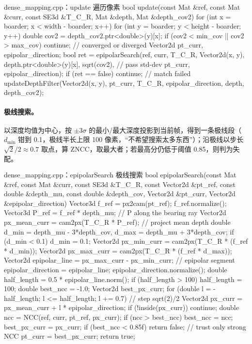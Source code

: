\begin{codebox}[C++]{dense\_mapping.cpp：update 遍历像素}
bool update(const Mat &ref, const Mat &curr, const SE3d &T_C_R,
            Mat &depth, Mat &depth_cov2) {
  for (int x = boarder; x < width  - boarder; x++)
  for (int y = boarder; y < height - boarder; y++) {
    double cov2 = depth_cov2.ptr<double>(y)[x];
    if (cov2 < min_cov || cov2 > max_cov) continue;   // converged or diverged
    Vector2d pt_curr, epipolar_direction;
    bool ret = epipolarSearch(ref, curr, T_C_R, Vector2d(x, y),
                 depth.ptr<double>(y)[x], sqrt(cov2),  // pass std-dev
                 pt_curr, epipolar_direction);
    if (ret == false) continue;                        // match failed
    updateDepthFilter(Vector2d(x, y), pt_curr, T_C_R,
                      epipolar_direction, depth, depth_cov2);
  }
}
\end{codebox}

\paragraph{极线搜索。}
以深度均值为中心，按 $\pm 3\sigma$ 的最小/最大深度投影到当前帧，得到一条极线段（$d_{\min}$ 钳到 0.1，极线半长上限 100 像素，“不希望搜索太多东西”）；沿极线以步长 $\sqrt{2}/2\approx 0.7$ 取点，算 ZNCC，取最大者；若最高分仍低于阈值 0.85，则判为失配。

\begin{codebox}[C++]{dense\_mapping.cpp：epipolarSearch 极线搜索}
bool epipolarSearch(const Mat &ref, const Mat &curr, const SE3d &T_C_R,
    const Vector2d &pt_ref, const double &depth_mu, const double &depth_cov,
    Vector2d &pt_curr, Vector2d &epipolar_direction) {
  Vector3d f_ref = px2cam(pt_ref); f_ref.normalize();
  Vector3d P_ref = f_ref * depth_mu;                  // P along the bearing ray
  Vector2d px_mean_curr = cam2px(T_C_R * P_ref);      // project mean depth
  double d_min = depth_mu - 3*depth_cov, d_max = depth_mu + 3*depth_cov;
  if (d_min < 0.1) d_min = 0.1;
  Vector2d px_min_curr = cam2px(T_C_R * (f_ref * d_min));
  Vector2d px_max_curr = cam2px(T_C_R * (f_ref * d_max));
  Vector2d epipolar_line = px_max_curr - px_min_curr; // epipolar segment
  epipolar_direction = epipolar_line; epipolar_direction.normalize();
  double half_length = 0.5 * epipolar_line.norm();
  if (half_length > 100) half_length = 100;
  double best_ncc = -1.0; Vector2d best_px_curr;
  for (double l = -half_length; l <= half_length; l += 0.7) {  // step sqrt(2)/2
    Vector2d px_curr = px_mean_curr + l * epipolar_direction;
    if (!inside(px_curr)) continue;
    double ncc = NCC(ref, curr, pt_ref, px_curr);
    if (ncc > best_ncc) { best_ncc = ncc; best_px_curr = px_curr; }
  }
  if (best_ncc < 0.85f) return false;                 // trust only strong NCC
  pt_curr = best_px_curr; return true;
}
\end{codebox}

